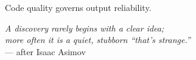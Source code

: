 \documentclass[preset=default, language=greek]{.labforge}
\begin{document}

\begin{flushright}

    Code quality governs output reliability.
    
    \textit{
        A discovery rarely begins with a clear idea;\\
        more often it is a quiet, stubborn ``that's strange.''
    }\\[0.3em]
    
    --- after Isaac Asimov
    
\end{flushright}
\end{document}
